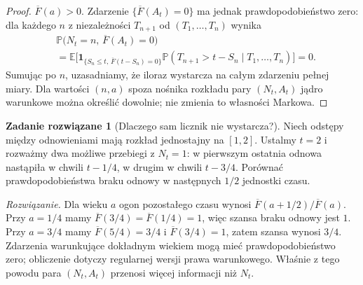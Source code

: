 \documentclass[11pt,a4paper,oneside]{report}
\numberwithin{equation}{chapter}
\theoremstyle{plain}
\theoremstyle{definition}
\newtheorem{zadanie}{Zadanie rozwiązane}[chapter]
\theoremstyle{remark}
\newcommand{\Prob}{\mathbb{P}}
\newcommand{\E}{\mathbb{E}}
\newcommand{\ind}[1]{\mathbf{1}_{#1}}
\begin{document}
\begin{proof}
$\overline F(a)>0$. Zdarzenie $\{\overline F(A_t)=0\}$
ma jednak prawdopodobieństwo zero: dla każdego $n$ z niezależności
$T_{n+1}$ od $(T_1,\ldots,T_n)$ wynika
\[
\begin{aligned}
&\Prob\bigl(N_t=n,\,\overline F(A_t)=0\bigr)\\
&=\E\bigl[\ind{\{S_n\le t,\,\overline F(t-S_n)=0\}}
     \Prob(T_{n+1}>t-S_n\mid T_1,\ldots,T_n)\bigr]=0.
\end{aligned}
\]
Sumując po $n$, uzasadniamy, że iloraz wystarcza na całym
zdarzeniu pełnej miary. Dla wartości $(n,a)$ spoza nośnika
rozkładu pary $(N_t,A_t)$ jądro warunkowe można określić
dowolnie; nie zmienia to własności Markowa.
\end{proof}

\begin{zadanie}[Dlaczego sam licznik nie wystarcza?]
Niech odstępy między odnowieniami mają rozkład jednostajny
na $[1,2]$. Ustalmy $t=2$ i rozważmy dwa możliwe przebiegi
z $N_t=1$: w pierwszym ostatnia odnowa nastąpiła w chwili
$t-1/4$, w drugim w chwili $t-3/4$. Porównać prawdopodobieństwa
braku odnowy w następnych $1/2$ jednostki czasu.

\emph{Rozwiązanie.} Dla wieku $a$ ogon pozostałego czasu
wynosi $\overline F(a+1/2)/\overline F(a)$.
Przy $a=1/4$ mamy $\overline F(3/4)=\overline F(1/4)=1$,
więc szansa braku odnowy jest $1$. Przy $a=3/4$ mamy
$\overline F(5/4)=3/4$ i $\overline F(3/4)=1$, zatem
szansa wynosi $3/4$. Zdarzenia warunkujące dokładnym
wiekiem mogą mieć prawdopodobieństwo zero; obliczenie
dotyczy regularnej wersji prawa warunkowego. Właśnie z tego
powodu para $(N_t,A_t)$ przenosi więcej informacji niż $N_t$.
\end{zadanie}
\end{document}
